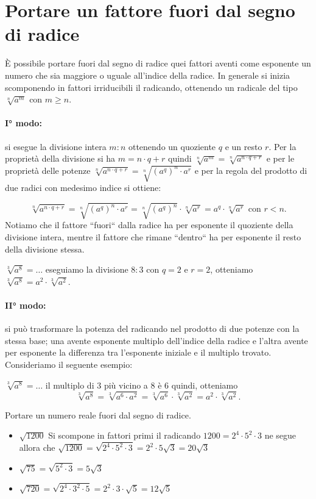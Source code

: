 \section{Portare un fattore fuori dal segno di radice}
\label{sec:radici_portare_fuori}

È possibile portare fuori dal segno di radice quei fattori aventi come 
esponente un numero che sia maggiore o uguale all'indice della radice. 
In generale si inizia scomponendo in fattori irriducibili il radicando, 
ottenendo un radicale del tipo $\sqrt[n]{a^m}$ con $m\ge n$.

\paragraph{I° modo:} si esegue la divisione intera $m:n$ ottenendo un 
quoziente $q$ e un resto $r$. Per la proprietà della divisione si 
ha $m=n\cdot q+r$ quindi $\sqrt[n]{a^m}=\sqrt[n]{a^{n\cdot q+r}}$ 
e per le proprietà delle potenze 
$\sqrt[n]{a^{n\cdot q+r}}=\sqrt[n]{(a^q)^n\cdot a^r}$ 
e per la regola del prodotto di due radici con medesimo indice si ottiene:

\[\sqrt[n]{a^{n\cdot q+r}}= \sqrt[n]{(a^q)^n\cdot a^r}=
  \sqrt[n]{(a^q)^n}\cdot \sqrt[n]{a^r}=
  a^q\cdot \sqrt[n]{a^r}\text{ con } r<n.\]
Notiamo che il fattore ``fuori`` dalla radice ha per esponente il quoziente 
della divisione intera, mentre il fattore che rimane ``dentro`` ha per 
esponente il resto della divisione stessa.

 $\sqrt[3]{a^8}=\ldots $ eseguiamo la divisione $8:3$ con $q=2$ e $r=2$, 
 otteniamo $\sqrt[3]{a^8}=a^2\cdot \sqrt[3]{a^2}$.

\paragraph{II° modo:} si può trasformare la potenza del radicando nel 
prodotto di due potenze con la stessa base; una avente esponente multiplo 
dell'indice della radice e l'altra avente per esponente la differenza tra 
l'esponente iniziale e il multiplo trovato. Consideriamo il seguente esempio:

 $\sqrt[3]{a^8}=\ldots $ il multiplo di $3$ più vicino a $8$ è $6$ quindi, 
 otteniamo 
\[\sqrt[3]{a^8}=\sqrt[3]{a^6\cdot a^2}=\sqrt[3]{a^6}\cdot \sqrt[3]{a^2}=
  a^2\cdot \sqrt[3]{a^2}.\]

 \begin{esempio}
 Portare un numero reale fuori dal segno di radice.
\begin{itemize}
 \item $\sqrt{1200}$ Si scompone in fattori primi il radicando 
       $1200=2^4\cdot 5^2\cdot 3$ ne segue allora che 
       $\sqrt{1200}=\sqrt{2^4\cdot 5^2\cdot 3}=2^2\cdot 5\sqrt 3=20\sqrt 3$
 \item $\sqrt{75}=\sqrt{5^2\cdot 3}=5\sqrt 3$
 \item $\sqrt{720}=\sqrt{2^4\cdot 3^2\cdot 5}=
        2^2\cdot 3\cdot \sqrt 5=12\sqrt 5$
\end{itemize}
 \end{esempio}

